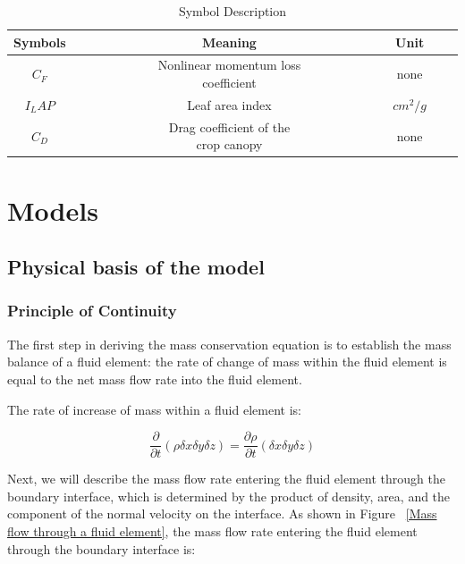 \documentclass{apmcmthesis}
\begin{document}
\begin{table}[]
    \centering
    \caption{Symbol Description}
    \begin{tabular}{ccccccc}
     \toprule
    Symbols & ~~~~~~~~~\qquad \qquad & Meaning & \qquad \qquad ~~~~~~~~~ & Unit \\
   \midrule
   $C_F$   &  ~~~~~~~~~ & Nonlinear momentum loss coefficient & ~~~~~~~~~ &  none \\
   $I_LAP$   &  ~~~~~~~~~ & Leaf area index  & ~~~~~~~~~ &  $ cm^2/g $ \\
   $ C_D $   & ~~~~~~~~~  & Drag coefficient of the crop canopy & ~~~~~~~~~ &  none\\
   \bottomrule
    \end{tabular}
    
    \label{tab:my_label}
\end{table}

\section{Models}
\subsection{Physical basis of the model}
\subsubsection{Principle of Continuity}
The first step in deriving the mass conservation equation is to establish the mass balance of a fluid element: the rate of change of mass within the fluid element is equal to the net mass flow rate into the fluid element.\cite{5}

The rate of increase of mass within a fluid element is:

\begin{equation}
\frac{\partial }{\partial t} (\rho \delta x \delta y \delta z) = \frac{\partial \rho}{\partial t} (\delta x \delta y \delta z) 
\end{equation}

Next, we will describe the mass flow rate entering the fluid element through the boundary interface, which is determined by the product of density, area, and the component of the normal velocity on the interface. As shown in Figure ~\ref{Mass flow through a fluid element}, the mass flow rate entering the fluid element through the boundary interface is:
\end{document}
